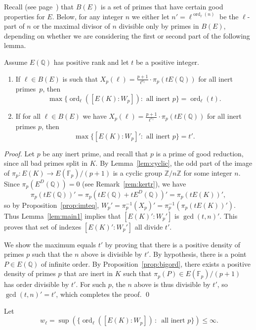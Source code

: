 \documentclass{oupau}
\DeclareMathOperator{\ord}{ord}
\newcommand{\FF}{\mathbb{F}}
\newcommand{\QQ}{\mathbb{Q}}
\newcommand{\ZZ}{\mathbb{Z}}
\begin{document}
Recall (see page~\pageref{defn:be}) that $B(E)$ is a set of primes
that have certain good properties for $E$.  Below, for any integer $n$ we
either let $n'=\ell^{\ord_{\ell}(n)}$ be the $\ell$-part of $n$ or the
maximal divisor of $n$ divisible only by primes in $B(E)$, depending
on whether we are considering the first or second part of the following lemma.
\begin{lemma}\label{lem:t}
Assume $E(\QQ)$ has positive rank and let $t$ be a positive integer. 
\begin{enumerate}
\item If $\ell \in B(E)$ is such that  
$X_{p}(\ell) = \frac{p+1}{\ell^{v_{\ell}}}\cdot  \pi_p(t E(\QQ))$
for all inert primes~$p$, then
$$
  \max\{\ord_{\ell}([E(K):W_p]):\text{ all inert $p$}\} = \ord_{\ell}(t).
$$
\item If for all $\ell \in B(E)$ we have
$X_{p}(\ell) = \frac{p+1}{\ell^{v_{\ell}}}\cdot  \pi_p(t E(\QQ))$ 
for all inert primes $p$, then 
$$
  \max\{[E(K):W_p]':\text{ all inert $p$}\} = t'.
$$
\end{enumerate}
\end{lemma}
\begin{proof}
Let $p$ be any inert prime, and recall  that $p$ is a prime of good reduction, 
since all bad primes split in $K$.  By Lemma~\ref{lem:cyclic},
the odd part of the image of $\pi_p:E(K)\to E(\FF_p)/(p+1)$ is a cyclic group $\ZZ/n\ZZ$
for some integer $n$. 
Since $\pi_p(E^D(\QQ)) = 0$ (see Remark~\ref{rem:kertr}), we have 
$$
  \pi_p(t E(\QQ))' = \pi_p( t E(\QQ) + t E^D(\QQ))' = \pi_p(t E(K))',
$$
so by Proposition~\ref{prop:imteq}, 
$W_p' = \pi_p^{-1}(X_p)' = \pi_p^{-1}(\pi_p( t E(K) )')$.
Thus Lemma~\ref{lem:main1} implies that $[E(K)':W_p']$ is $\gcd(t, n)'$.
This proves that set of indexes $[E(K)':W_p']$ all divide $t'$. 

We show the maximum equals $t'$ by proving that 
there is a positive density of primes $p$ such that 
the $n$ above is divisible by $t'$.
By hypothesis, there is a point $P\in E(\QQ)$ of infinite order.
By Proposition~\ref{prop:bigord}, there exists a positive
density of primes $p$ that are inert in $K$ such that 
$\pi_p(P) \in E(\FF_{p})/(p+1)$ has order divisible by $t'$.
For such $p$, the $n$ above is thus divisible by $t'$, so 
$\gcd(t,n)'=t'$, which completes the proof.
\qed\end{proof}

Let 
\begin{equation}\label{eqn:well}
\  w_{\ell} = \sup(\{\ord_{\ell}([E(K):W_p])\,  : \, \text{ all inert } p\}) \leq \infty.
\end{equation}
\end{document}
